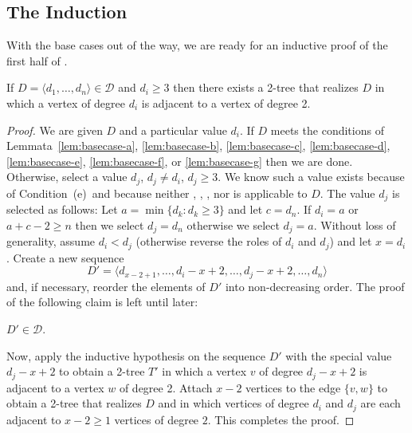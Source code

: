 \documentclass[lotsofwhite,charterfonts]{patmorin}
\newcommand{\fourds}{Condition~(e)}
\begin{document}
\subsection{The Induction}

With the base cases out of the way, we are ready for an inductive
proof of the first half of .

\begin{lem}
If $D=\langle d_1,\ldots,d_n\rangle \in \mathcal{D}$ and $d_i\ge 3$
then there exists a 2-tree that realizes $D$ in which a vertex of
degree $d_i$ is adjacent to a vertex of degree 2.  
\end{lem}

\begin{proof}
We are given $D$ and a particular value $d_i$. If $D$ meets the
conditions of Lemmata~\ref{lem:basecase-a}, \ref{lem:basecase-b},
\ref{lem:basecase-c}, \ref{lem:basecase-d}, \ref{lem:basecase-e},
\ref{lem:basecase-f}, or
\ref{lem:basecase-g} then we are done.  Otherwise, select a value
$d_j$, $d_j\neq d_i$, $d_j\ge 3$.  We know such a value exists because
of \fourds\ and because
neither , , ,
nor  is applicable to $D$.  The value $d_j$ is
selected as follows:  Let $a=\min\{d_k : d_k\ge 3\}$ and let $c=d_n$.
If $d_i=a$ or $a+c-2 \ge n$ then we select $d_j=d_n$ otherwise we
select $d_j=a$.  Without loss of generality, assume $d_i < d_j$
(otherwise reverse the roles of $d_i$ and $d_j$) and let $x=d_i$.
Create a new sequence 
\[  
   D'=\langle d_{x-2+1},\ldots,d_{i}-x+2,\ldots,d_{j}-x+2,\ldots,d_n \rangle
\] 
and, if necessary, reorder the elements of $D'$ into non-decreasing
order.  The proof of the following claim is left until later:

\begin{clm}
$D'\in \mathcal{D}$.
\end{clm}

Now, apply the inductive hypothesis on the sequence $D'$ with the
special value $d_j-x+2$ to obtain a 2-tree $T'$ in which a vertex $v$
of degree $d_j-x+2$ is adjacent to a vertex $w$ of degree 2.  Attach
$x-2$ vertices to the edge $\{v,w\}$ to obtain a 2-tree that realizes
$D$ and in which vertices of degree $d_i$ and $d_j$ are each adjacent
to $x-2\ge 1$ vertices of degree $2$.  This completes the proof.
\end{proof}
\end{document}

